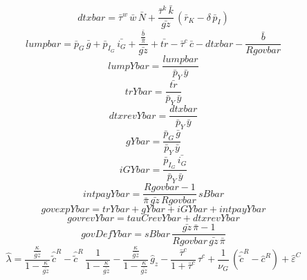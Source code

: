 \begin{dmath*}
dtxbar = {\bar{\tau}^w}\, {\bar{w}}\, {\bar{N}}+\frac{{\bar{\tau}^k}\, {\bar{k}}}{{\bar{gz}}}\, \left({\bar{r}_K}-{\delta}\, {\bar{p}_I}\right)
\end{dmath*}
\begin{dmath*}
lumpbar = {\bar{p}_G}\, {\bar{g}}+{\bar{p}_{I_G}}\, {\bar{i_G}}+\frac{\frac{{\bar{b}}}{{\bar{\pi}}}}{{\bar{gz}}}+{\bar{tr}}-{\bar{\tau}^c}\, {\bar{c}}-{dtxbar}-\frac{{\bar{b}}}{{Rgovbar}}
\end{dmath*}
\begin{dmath*}
lumpYbar = \frac{{lumpbar}}{{\bar{p}_Y}\, {\bar{y}}}
\end{dmath*}
\begin{dmath*}
trYbar = \frac{{\bar{tr}}}{{\bar{p}_Y}\, {\bar{y}}}
\end{dmath*}
\begin{dmath*}
dtxrevYbar = \frac{{dtxbar}}{{\bar{p}_Y}\, {\bar{y}}}
\end{dmath*}
\begin{dmath*}
gYbar = \frac{{\bar{p}_G}\, {\bar{g}}}{{\bar{p}_Y}\, {\bar{y}}}
\end{dmath*}
\begin{dmath*}
iGYbar = \frac{{\bar{p}_{I_G}}\, {\bar{i_G}}}{{\bar{p}_Y}\, {\bar{y}}}
\end{dmath*}
\begin{dmath*}
intpayYbar = \frac{{Rgovbar}-1}{{\bar{\pi}}\, {\bar{gz}}\, {Rgovbar}}\, {sBbar}
\end{dmath*}
\begin{dmath*}
govexpYbar = {trYbar}+{gYbar}+{iGYbar}+{intpayYbar}
\end{dmath*}
\begin{dmath*}
govrevYbar = {tauCrevYbar}+{dtxrevYbar}
\end{dmath*}
\begin{dmath*}
govDefYbar = {sBbar}\, \frac{{\bar{gz}}\, {\bar{\pi}}-1}{{Rgovbar}\, {\bar{gz}}\, {\bar{\pi}}}
\end{dmath*}
\begin{dmath}
{\hat{\lambda}}=\frac{\frac{{\kappa}}{{\bar{gz}}}}{1-\frac{{\kappa}}{{\bar{gz}}}}\, {\hat{\tilde{c}}^R}-{\hat{\tilde{c}}^R}\, \frac{1}{1-\frac{{\kappa}}{{\bar{gz}}}}-\frac{\frac{{\kappa}}{{\bar{gz}}}}{1-\frac{{\kappa}}{{\bar{gz}}}}\, {{\hat{g}_z}}-\frac{{\bar{\tau}^c}}{1+{\bar{\tau}^c}}\, {\hat{\tau}^c}+\frac{1}{{\nu_G}}\, \left({\hat{\tilde{c}}^R}-{\hat{c}^R}\right)+{\hat{\varepsilon}^C}
\end{dmath}
